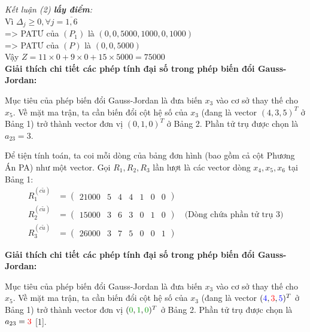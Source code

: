 \vspace{0.3cm}
\textit{Kết luận (2) \textbf{lấy điểm}:} \\
Vì $\Delta_j \ge 0, \forall j=\overline{1,6}$ \\
=> PATƯ của $(P_1)$ là $(0,0,5000,1000,0,1000)$ \\
=> PATƯ của $(P)$ là $(0,0,5000)$ \\
Vậy $Z = 11 \times 0 + 9 \times 0 + 15 \times 5000 = 75000$ \\

\vspace{0.3cm}
\textbf{Giải thích chi tiết các phép tính đại số trong phép biến đổi Gauss-Jordan:}

Mục tiêu của phép biến đổi Gauss-Jordan là đưa biến $x_3$ vào cơ sở thay thế cho $x_5$. Về mặt ma trận, ta cần biến đổi cột hệ số của $x_3$ (đang là vector $(4, 3, 5)^T$ ở Bảng 1) trở thành vector đơn vị $(0, 1, 0)^T$ ở Bảng 2. Phần tử trụ được chọn là $a_{23} = 3$. 

Để tiện tính toán, ta coi mỗi dòng của bảng đơn hình (bao gồm cả cột Phương Án PA) như một vector. Gọi $R_1, R_2, R_3$ lần lượt là các vector dòng $x_4, x_5, x_6$ tại Bảng 1:
\begin{align*}
    R_1^{(c\tilde{u})} &= \begin{pmatrix} 21000 & 5 & 4 & 4 & 1 & 0 & 0 \end{pmatrix} \\
    R_2^{(c\tilde{u})} &= \begin{pmatrix} 15000 & 3 & 6 & 3 & 0 & 1 & 0 \end{pmatrix} \quad \text{(Dòng chứa phần tử trụ $3$)} \\
    R_3^{(c\tilde{u})} &= \begin{pmatrix} 26000 & 3 & 7 & 5 & 0 & 0 & 1 \end{pmatrix}
\end{align*}

\vspace{0.3cm}
\textbf{Giải thích chi tiết các phép tính đại số trong phép biến đổi Gauss-Jordan:}

Mục tiêu của phép biến đổi Gauss-Jordan là đưa biến $x_3$ vào cơ sở thay thế cho $x_5$. Về mặt ma trận, ta cần biến đổi cột hệ số của $x_3$ (đang là vector $(\textcolor{blue}{4}, \textcolor{red}{3}, \textcolor{blue}{5})^T$ ở Bảng 1) trở thành vector đơn vị $(\textcolor{green!60!black}{0}, \textcolor{green!60!black}{1}, \textcolor{green!60!black}{0})^T$ ở Bảng 2. Phần tử trụ được chọn là $a_{23} = \textcolor{red}{3}$ [1].

